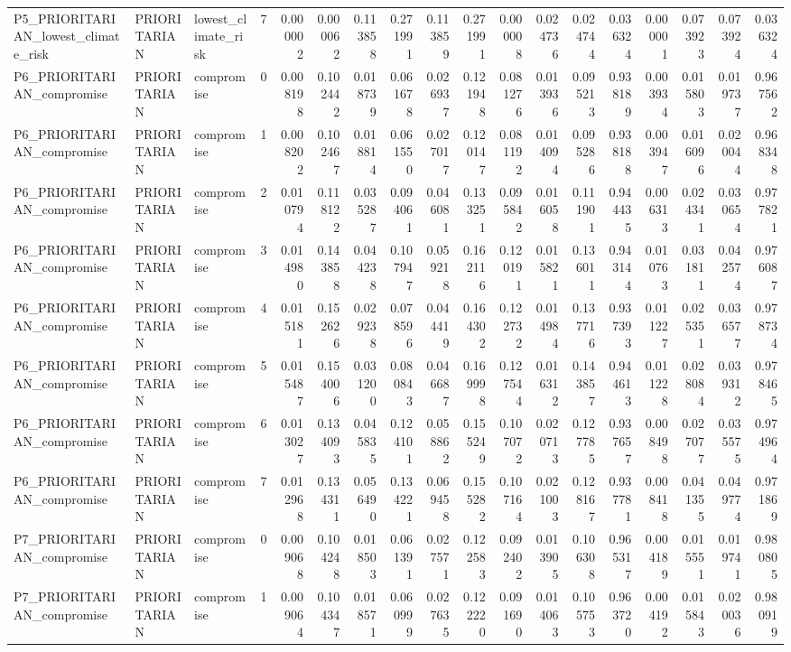 \begin{tabular}{lllrrrrrrrrrrrrrrr}
P5_PRIORITARIAN_lowest_climate_risk & PRIORITARIAN & lowest_climate_risk & 7 & 0.000002 & 0.000062 & 0.113858 & 0.271991 & 0.113859 & 0.271991 & 0.000008 & 0.024736 & 0.024744 & 0.036324 & 0.000001 & 0.073923 & 0.073924 & 0.036324 \\
P6_PRIORITARIAN_compromise & PRIORITARIAN & compromise & 0 & 0.008198 & 0.102442 & 0.018739 & 0.061678 & 0.026937 & 0.121948 & 0.081276 & 0.013936 & 0.095213 & 0.938189 & 0.003934 & 0.015803 & 0.019737 & 0.967562 \\
P6_PRIORITARIAN_compromise & PRIORITARIAN & compromise & 1 & 0.008202 & 0.102467 & 0.018814 & 0.061550 & 0.027017 & 0.120147 & 0.081192 & 0.014094 & 0.095286 & 0.938188 & 0.003947 & 0.016096 & 0.020044 & 0.968348 \\
P6_PRIORITARIAN_compromise & PRIORITARIAN & compromise & 2 & 0.010794 & 0.118122 & 0.035287 & 0.094061 & 0.046081 & 0.133251 & 0.095842 & 0.016058 & 0.111901 & 0.944435 & 0.006313 & 0.024341 & 0.030654 & 0.977821 \\
P6_PRIORITARIAN_compromise & PRIORITARIAN & compromise & 3 & 0.014980 & 0.143858 & 0.044238 & 0.107947 & 0.059218 & 0.162116 & 0.120191 & 0.015821 & 0.136011 & 0.943144 & 0.010763 & 0.031811 & 0.042574 & 0.976087 \\
P6_PRIORITARIAN_compromise & PRIORITARIAN & compromise & 4 & 0.015181 & 0.152626 & 0.029238 & 0.078596 & 0.044419 & 0.164302 & 0.122732 & 0.014984 & 0.137716 & 0.937393 & 0.011227 & 0.025351 & 0.036577 & 0.978734 \\
P6_PRIORITARIAN_compromise & PRIORITARIAN & compromise & 5 & 0.015487 & 0.154006 & 0.031200 & 0.080843 & 0.046687 & 0.169998 & 0.127544 & 0.016312 & 0.143857 & 0.944613 & 0.011228 & 0.028084 & 0.039312 & 0.978465 \\
P6_PRIORITARIAN_compromise & PRIORITARIAN & compromise & 6 & 0.013027 & 0.134093 & 0.045835 & 0.124101 & 0.058862 & 0.155249 & 0.107072 & 0.020713 & 0.127785 & 0.937657 & 0.008498 & 0.027077 & 0.035575 & 0.974964 \\
P6_PRIORITARIAN_compromise & PRIORITARIAN & compromise & 7 & 0.012968 & 0.134311 & 0.056490 & 0.134221 & 0.069458 & 0.155282 & 0.107164 & 0.021003 & 0.128167 & 0.937781 & 0.008418 & 0.041355 & 0.049774 & 0.971869 \\
P7_PRIORITARIAN_compromise & PRIORITARIAN & compromise & 0 & 0.009068 & 0.104248 & 0.018503 & 0.061391 & 0.027571 & 0.122583 & 0.092402 & 0.013905 & 0.106308 & 0.965317 & 0.004189 & 0.015551 & 0.019741 & 0.980805 \\
P7_PRIORITARIAN_compromise & PRIORITARIAN & compromise & 1 & 0.009064 & 0.104347 & 0.018571 & 0.060999 & 0.027635 & 0.122220 & 0.091690 & 0.014063 & 0.105753 & 0.963720 & 0.004192 & 0.015843 & 0.020036 & 0.980919 \\

\end{tabular}
